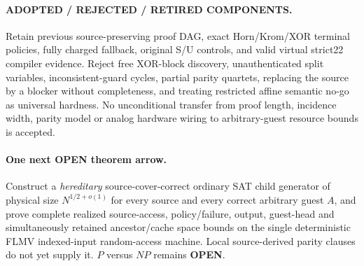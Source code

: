 \documentclass[11pt]{article}
\begin{document}
\paragraph{ADOPTED / REJECTED / RETIRED COMPONENTS.} Retain previous source-preserving proof DAG, exact Horn/Krom/XOR terminal policies, fully charged fallback, original S/U controls, and valid virtual strict22 compiler evidence. Reject free XOR-block discovery, unauthenticated split variables, inconsistent-guard cycles, partial parity quartets, replacing the source by a blocker without completeness, and treating restricted affine semantic no-go as universal hardness. No unconditional transfer from proof length, incidence width, parity model or analog hardware wiring to arbitrary-guest resource bounds is accepted.

\paragraph{One next OPEN theorem arrow.} Construct a \emph{hereditary} source-cover-correct ordinary SAT child generator of physical size $N^{1/2+o(1)}$ for every source and every correct arbitrary guest $A$, and prove complete realized source-access, policy/failure, output, guest-head and simultaneously retained ancestor/cache space bounds on the single deterministic FLMV indexed-input random-access machine. Local source-derived parity clauses do not yet supply it. $P$ versus $NP$ remains \textbf{OPEN}.



\end{document}
